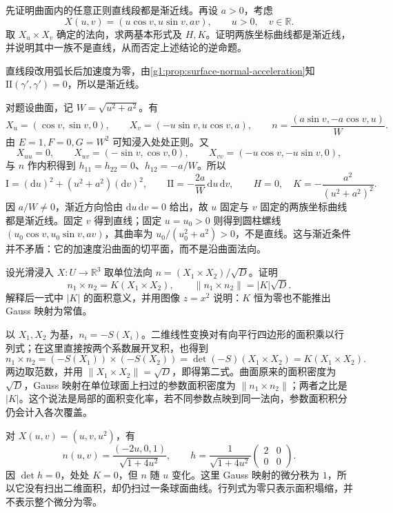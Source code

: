 \begin{exercise}\label{g1:ex:helicoid-asymptotic-curves}
	先证明曲面内的任意正则直线段都是渐近线。再设 \(a>0\)，考虑
	\[
		X(u,v)=(u\cos v,u\sin v,av),\qquad u>0,\quad v\in\mathbb R.
	\]
	取 \(X_u\times X_v\) 确定的法向，求两基本形式及 \(H,K\)。证明两族坐标曲线都是渐近线，并说明其中一族不是直线，从而否定上述结论的逆命题。
\end{exercise}
\begin{solution}
	直线段改用弧长后加速度为零，由\cref{g1:prop:surface-normal-acceleration}知 \(\mathrm{II}(\gamma',\gamma')=0\)，所以是渐近线。

	对题设曲面，记 \(W=\sqrt{u^2+a^2}\)。有
	\[
		X_u=(\cos v,\sin v,0),\qquad X_v=(-u\sin v,u\cos v,a),\qquad
		n=\frac{(a\sin v,-a\cos v,u)}W.
	\]
	由 \(E=1,F=0,G=W^2\) 可知浸入处处正则。又
	\[
		X_{uu}=0,\qquad X_{uv}=(-\sin v,\cos v,0),\qquad
		X_{vv}=(-u\cos v,-u\sin v,0),
	\]
	与 \(n\) 作内积得到 \(h_{11}=h_{22}=0\)、\(h_{12}=-a/W\)。所以
	\[
		\mathrm I=(\mathrm du)^2+(u^2+a^2)(\mathrm dv)^2,\qquad
		\mathrm{II}=-\frac{2a}{W}\,\mathrm du\,\mathrm dv,\qquad
		H=0,\quad K=-\frac{a^2}{(u^2+a^2)^2}.
	\]
	因 \(a/W\ne0\)，渐近方向恰由 \(\mathrm du\,\mathrm dv=0\) 给出，故 \(u\) 固定与 \(v\) 固定的两族坐标曲线都是渐近线。固定 \(v\) 得到直线；固定 \(u=u_0>0\) 则得到圆柱螺线 \((u_0\cos v,u_0\sin v,av)\)，其曲率为 \(u_0/(u_0^2+a^2)>0\)，不是直线。这与渐近条件并不矛盾：它的加速度沿曲面的切平面，而不是沿曲面法向。
\end{solution}

\begin{exercise}\label{g1:ex:gauss-map-area-factor}
	设光滑浸入 \(X:U\to\mathbb R^3\) 取单位法向 \(n=(X_1\times X_2)/\sqrt D\)。证明
	\[
		n_1\times n_2=K(X_1\times X_2),\qquad
		\lVert n_1\times n_2\rVert=|K|\sqrt D.
	\]
	解释后一式中 \(|K|\) 的面积意义，并用图像 \(z=x^2\) 说明：\(K\) 恒为零也不能推出 Gauss 映射为常值。
\end{exercise}
\begin{solution}
	以 \(X_1,X_2\) 为基，\(n_i=-S(X_i)\)。二维线性变换对有向平行四边形的面积乘以行列式；在这里直接按两个系数展开叉积，也得到
	\[
		n_1\times n_2=(-S(X_1))\times(-S(X_2))
		=\det(-S)(X_1\times X_2)=K(X_1\times X_2).
	\]
	两边取范数，并用 \(\lVert X_1\times X_2\rVert=\sqrt D\)，即得第二式。曲面原来的面积密度为 \(\sqrt D\)，Gauss 映射在单位球面上扫过的参数面积密度为 \(\lVert n_1\times n_2\rVert\)；两者之比是 \(|K|\)。这个说法是局部的面积变化率，若不同参数点映到同一法向，参数面积积分仍会计入各次覆盖。

	对 \(X(u,v)=(u,v,u^2)\)，有
	\[
		n(u,v)=\frac{(-2u,0,1)}{\sqrt{1+4u^2}},\qquad
		h=\frac1{\sqrt{1+4u^2}}\begin{pmatrix}2&0\\0&0\end{pmatrix}.
	\]
	因 \(\det h=0\)，处处 \(K=0\)，但 \(n\) 随 \(u\) 变化。这里 Gauss 映射的微分秩为 \(1\)，所以它没有扫出二维面积，却仍扫过一条球面曲线。行列式为零只表示面积塌缩，并不表示整个微分为零。
\end{solution}


